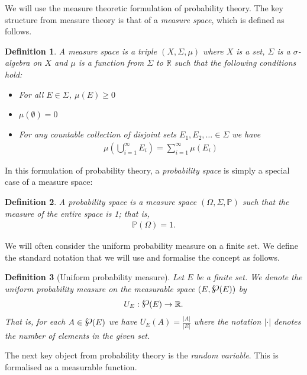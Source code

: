 \documentclass{article}
\newcommand{\powerset}{\raisebox{.15\baselineskip}{\Large\ensuremath{\wp}}}
\newtheorem{definition}{Definition}
\theoremstyle{remark}
\renewcommand{\P}{\mathbb{P}}
\begin{document}
We will use the measure theoretic formulation of probability theory. The key
structure from measure theory is that of a \textit{measure space}, which is
defined as follows.

\begin{definition}
	A measure space is a triple $(X, \Sigma, \mu)$ where $X$ is a set, $\Sigma$
	is a $\sigma$-algebra on $X$ and $\mu$ is a function from $\Sigma$ to
	$\mathbb{R}$ such that the following conditions hold:
	\begin{itemize}
		\item For all $E \in \Sigma$, $\mu(E) \ge 0$
		\item $\mu(\emptyset) = 0$
		\item For any countable collection of disjoint sets $E_1, E_2, \ldots
			\in \Sigma$ we have
			\begin{align*}
				\mu\left(\bigcup_{i=1}^\infty E_i\right) =
				\sum_{i=1}^\infty \mu(E_i)
			\end{align*}
	\end{itemize}
\end{definition}

In this formulation of probability theory, a \textit{probability space} is
simply a special case of a measure space:

\begin{definition}
	A probability space is a measure space $(\Omega, \Sigma, \P)$ such that the
	measure of the entire space is 1; that is,
	\begin{align*}
		\P(\Omega) = 1.
	\end{align*}
\end{definition}

We will often consider the uniform probability measure on a finite set. We
define the standard notation that we will use and formalise the concept as
follows.

\begin{definition}[Uniform probability measure]
	Let $E$ be a finite set. We denote the uniform probability measure on the
	measurable space $(E, \powerset(E))$ by
	\begin{align*}
		U_E: \powerset(E) \to \mathbb{R}.
	\end{align*}
	That is, for each $A \in \powerset(E)$ we have $U_E(A) = \frac{|A|}{|E|}$
	where the notation $|\cdot|$ denotes the number of elements in the given
	set.
\end{definition}

The next key object from probability theory is the \textit{random variable}.
This is formalised as a measurable function.
\end{document}

